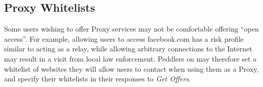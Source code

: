 \subsection{Proxy Whitelists}

Some users wishing to offer Proxy services may not be comfortable offering ``open access''. For example, allowing users to access facebook.com has a risk profile similar to acting as a relay, while allowing arbitrary connections to the Internet may result in a visit from local law enforcement. Peddlers on \tOM{} may therefore set a whitelist of websites they will allow users to contact when using them as a Proxy, and specify their whitelists in their responses to \emph{Get Offers}.

